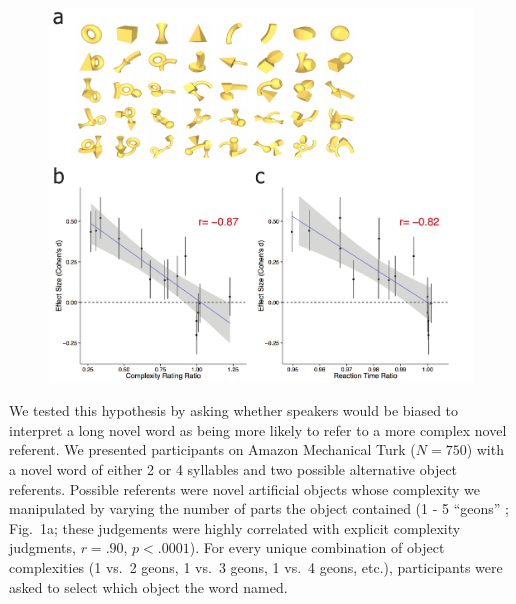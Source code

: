 \documentclass[12pt]{article}
\begin{document}
\begin{figure}[t]
\begin{center}
\includegraphics[scale = .5]{figs/geons.pdf}
\caption{}%
\end{center}
\label{fig:geons}
\end{figure}

We tested this hypothesis by asking whether speakers would be biased to interpret a long novel word as being more likely to refer to a more complex novel referent. We presented participants on Amazon Mechanical Turk ($N=750$) with a novel word of either 2 or 4 syllables and two possible alternative object referents. Possible referents were novel artificial objects whose complexity we manipulated by varying the number of parts the object contained (1 - 5 ``geons'' \cite{biederman1987}; Fig.\ 1a; these judgements were highly correlated with explicit complexity judgments, $r = .90$, $p < .0001$). For every unique combination of object complexities (1 vs.\ 2 geons, 1 vs.\ 3 geons, 1 vs.\ 4 geons, etc.), participants were asked to select which object the word named. 
\end{document}
